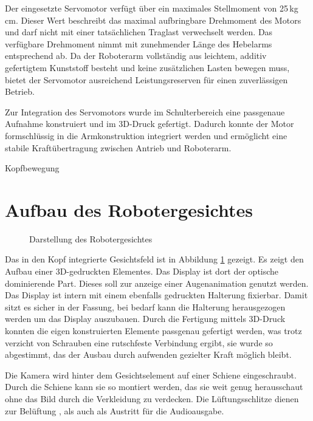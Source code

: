 Der eingesetzte Servomotor verfügt über ein maximales Stellmoment von 25\,kg\,cm. Dieser Wert beschreibt das maximal aufbringbare Drehmoment des Motors und darf nicht mit einer tatsächlichen Traglast verwechselt werden. Das verfügbare Drehmoment nimmt mit zunehmender Länge des Hebelarms entsprechend ab. Da der Roboterarm vollständig aus leichtem, additiv gefertigtem Kunststoff besteht und keine zusätzlichen Lasten bewegen muss, bietet der Servomotor ausreichend Leistungsreserven für einen zuverlässigen Betrieb.

Zur Integration des Servomotors wurde im Schulterbereich eine passgenaue Aufnahme konstruiert und im 3D-Druck gefertigt. Dadurch konnte der Motor formschlüssig in die Armkonstruktion integriert werden und ermöglicht eine stabile Kraftübertragung zwischen Antrieb und Roboterarm.

Kopfbewegung


\section{Aufbau des Robotergesichtes}

\begin{figure}[htbp]
	\centering
	
	\caption{Darstellung des Robotergesichtes}
	\label{fig:RoboterGesicht}
\end{figure}

Das in den Kopf integrierte Gesichtsfeld ist in Abbildung \ref{fig:RoboterGesicht} gezeigt. Es zeigt den Aufbau einer 3D-gedruckten Elementes. Das Display ist dort der optische dominierende Part. Dieses soll zur anzeige einer Augenanimation genutzt werden. Das Display ist intern mit einem ebenfalls gedruckten Halterung fixierbar. Damit sitzt es sicher in der Fassung, bei bedarf kann die Halterung herausgezogen werden um das Display auszubauen. Durch die Fertigung mittels 3D-Druck konnten die eigen konstruierten Elemente passgenau gefertigt werden, was trotz verzicht von Schrauben eine rutschfeste Verbindung ergibt, sie wurde so abgestimmt, das der Ausbau durch aufwenden gezielter Kraft möglich bleibt.

Die Kamera wird hinter dem Gesichtselement auf einer Schiene eingeschraubt. Durch die Schiene kann sie so montiert werden, das sie weit genug herausschaut ohne das Bild durch  die Verkleidung zu verdecken.
Die Lüftungsschlitze dienen zur Belüftung , als auch als Austritt für die Audioausgabe. 


